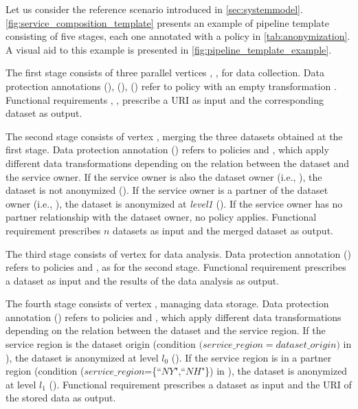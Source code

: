 \begin{example}[\bf \pipelineTemplate]\label{ex:template}
Let us consider the reference scenario introduced in \cref{sec:systemmodel}.
\cref{fig:service_composition_template} presents an example of pipeline template consisting of five stages, each one annotated with a policy in \cref{tab:anonymization}.
{\color{OurColor}A visual aid to this example is presented in \cref{fig:pipeline_template_example}}.

The first stage consists of three parallel vertices , ,  for data collection.
Data protection annotations \myLambda(), \myLambda(), \myLambda() refer to policy  with an empty transformation .
Functional requirements , ,   prescribe a URI as input and the corresponding dataset as output.

The second stage consists of vertex , merging the three datasets obtained at the first stage. Data protection annotation \myLambda() refers to policies  and , which apply different data transformations depending on the relation between the dataset and the service owner.
If the service owner is also the dataset owner (i.e., \pone), the dataset is not anonymized (). If the service owner is a partner of the dataset owner (i.e., \ptwo), the dataset is anonymized at \emph{level1} (). If the service owner has no partner relationship with the dataset owner, no policy applies.
Functional requirement  prescribes $n$ datasets as input and the merged dataset as output.

The third stage consists of vertex   for data analysis.
Data protection annotation \myLambda() refers to policies  and , as for the second stage.
Functional requirement  prescribes a dataset as input and the results of the data analysis as output.

The fourth stage consists of vertex , managing data storage. Data protection annotation \myLambda() refers to policies  and , which apply different data transformations depending on the relation between the dataset and the service region.
If the service region is the dataset origin (condition $(service\_region$$=$$dataset\_origin)$ in ), the dataset is anonymized at level $l_0$ ().
If the service region is in a partner region (condition ($service\_region$=\{``$NY$",``$NH$"\}) in ), the dataset is anonymized at level $l_1$ ().
Functional requirement  prescribes a dataset as input and the URI of the stored data as output.


\end{example}
